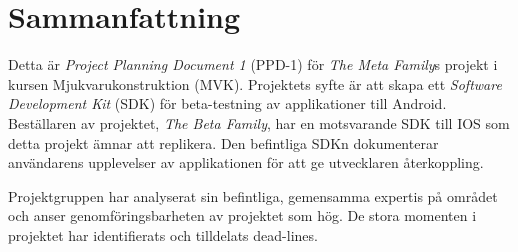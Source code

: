 \section*{Sammanfattning} %
Detta är \textit{Project Planning Document 1} (PPD-1) för \textit{The Meta Family}s projekt i kursen Mjukvarukonstruktion (MVK). Projektets syfte är att skapa ett \textit{Software Development Kit} (SDK) för beta-testning av applikationer till Android. Beställaren av projektet, \textit{The Beta Family}, har en motsvarande SDK till IOS som detta projekt ämnar att replikera. Den befintliga SDKn dokumenterar användarens upplevelser av applikationen för att ge utvecklaren återkoppling.

Projektgruppen har analyserat sin befintliga, gemensamma expertis på området och anser genomföringsbarheten av projektet som hög. De stora momenten i projektet har identifierats och tilldelats dead-lines.
